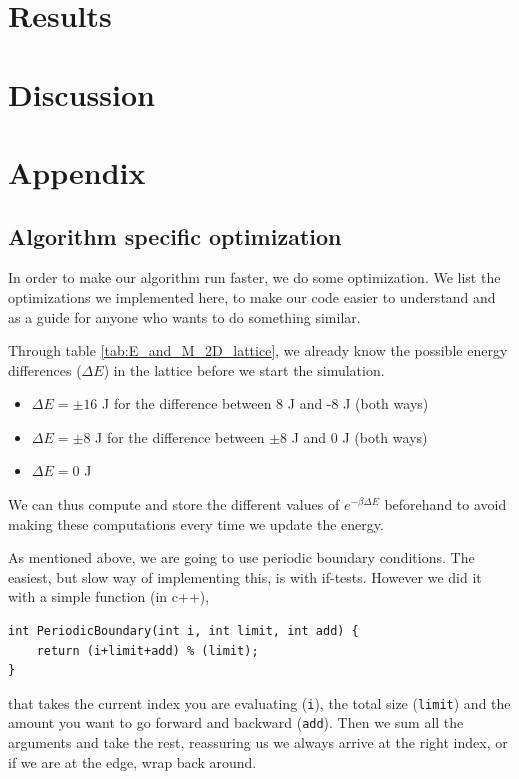 \documentclass[reprint, english,notitlepage,nofootinbib]{revtex4-1}  %
\begin{document}
\section{Results}

\section{Discussion}

\section{Appendix}
\subsection{Algorithm specific optimization}

In order to make our algorithm run faster, we do some optimization. We list the optimizations we implemented here, to make our code easier to understand and as a guide for anyone who wants to do something similar.

Through table \ref{tab:E_and_M_2D_lattice}, we already know the possible energy differences ($\Delta E$) in the lattice before we start the simulation. 
\begin{itemize}
	\item $\Delta E = \pm 16$ J for the difference between 8 J and -8 J (both ways)
	\item $\Delta E = \pm 8$ J for the difference between $\pm 8$ J and 0 J (both ways)
	\item $\Delta E = 0$ J
\end{itemize}
We can thus compute and store the different values of $e^{- \beta \Delta E}$ beforehand to avoid making these computations every time we update the energy.

As mentioned above, we are going to use periodic boundary conditions. The easiest, but slow way of implementing this, is with if-tests. However we did it with a simple function (in c++),
\begin{lstlisting}
int PeriodicBoundary(int i, int limit, int add) { 
	return (i+limit+add) % (limit);
}
\end{lstlisting}
that takes the current index you are evaluating (\texttt{i}), the total size (\texttt{limit}) and the amount you want to go forward and backward (\texttt{add}). Then we sum all the arguments and take the rest, reassuring us we always arrive at the right index, or if we are at the edge, wrap back around.
\end{document}
